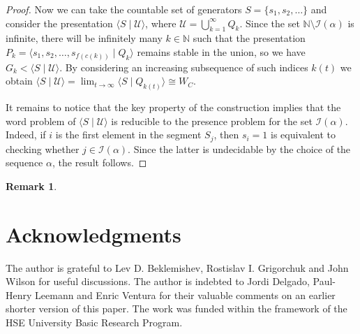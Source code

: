 \documentclass[12pt,a4paper]{amsart}
\newtheorem{remark}{Remark}
\begin{document}
\begin{proof}
\smallskip
Now we can take the countable set of generators $S=\{s_1,s_2,\ldots \}$ and consider the presentation $\langle S \mid \mathcal U\rangle$, where $\mathcal U = \bigcup_{k=1}^{\infty} Q_k$. Since the set $\mathbb N\setminus \mathcal{I}(\alpha)$ is infinite, there will be infinitely many $k\in \mathbb N$ such that the presentation $P_k=\langle s_1,s_2,\ldots,s_{f(c(k))} \mid Q_k \rangle$ remains stable in the union, so we have $G_k<\langle S \mid \mathcal U \rangle$. By considering an increasing subsequence of such indices $k(t)$ we obtain $\langle S \mid \mathcal U \rangle = \lim_{t\to \infty} \langle S\mid Q_{k(t)} \rangle \cong W_C$. 

It remains to notice that the key property of the construction implies that the word problem of $\langle S \mid \mathcal U\rangle$ is reducible to the presence problem for the set $\mathcal{I}(\alpha)$. Indeed, if $i$ is the first element in the segment $S_j$, then $s_i=1$ is equivalent to checking whether $j\in\mathcal I(\alpha)$. Since the latter is undecidable by the choice of the sequence $\alpha$, the result follows.
\end{proof}

\begin{remark}
\end{remark}



\section{Acknowledgments}
The author is grateful to Lev D. Beklemishev, Rostislav I. Grigorchuk and John Wilson for useful discussions. The author is indebted to Jordi Delgado, Paul-Henry Leemann and Enric Ventura for their valuable comments on an earlier shorter version of this paper. The work was funded within the framework of the HSE University Basic Research Program.
\end{document}
